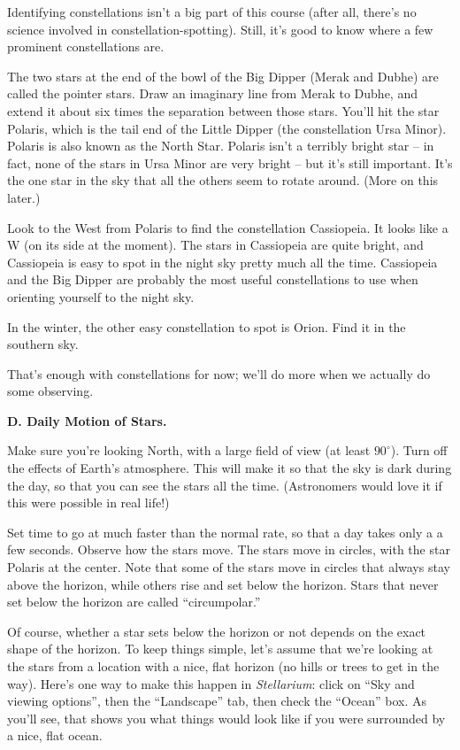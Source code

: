 Identifying constellations isn't a big part of this course (after
all, there's no science involved in constellation-spotting).  Still, it's
good to know where a few prominent constellations are.

The two stars at the end of the bowl of the Big Dipper (Merak and Dubhe)
are called the pointer stars.  Draw an imaginary line from Merak to Dubhe,
and extend it about six times the separation between those stars.
You'll hit the star Polaris, which is the tail end of the
Little Dipper (the constellation Ursa Minor).  Polaris is also known
as the North Star.  Polaris isn't a terribly bright star -- in fact,
none of the stars in Ursa Minor are very bright -- but it's still
important.  It's the one star in the sky that all the others seem
to rotate around.  (More on this later.)

Look to the West from Polaris to find the constellation Cassiopeia.  It
looks like a W (on its side at the moment).  The stars in Cassiopeia
are quite bright, and Cassiopeia is easy to spot in the night sky pretty
much all the time.  Cassiopeia and the Big Dipper are probably the most
useful constellations to use when orienting yourself to the night sky.

In the winter, the other easy constellation to spot is Orion. Find
it in the southern sky.

That's enough with constellations for now; we'll do more when we actually
do some observing.

\bigskip

{\bf D. Daily Motion of Stars.}

Make sure you're looking North, with a large field
of view (at least $90^\circ$).  Turn off the effects of Earth's 
atmosphere.
This will make it so that the sky is dark during the day, so that
you can see the stars all the time.  (Astronomers would love
it if this were possible in real life!)

Set time to go at much faster than the normal rate,
so that a day takes only a a few seconds.
Observe how the stars move.
The stars move in circles, with the star Polaris at the center.
Note that some of the stars move in circles that always stay
above the horizon, while others rise and set below the horizon.
Stars that never set below the horizon are called ``circumpolar.''

Of course, whether a star sets below the horizon or not depends on
the exact shape of the horizon. To keep things simple, let's assume that
we're looking at the stars from a location with a nice, flat horizon
(no hills or trees to get in the way). Here's one way to make this happen
in \textit{Stellarium}: click on ``Sky and viewing options'', then
the ``Landscape'' tab, then check the ``Ocean'' box. As you'll
see, that shows you what things would look like if you were surrounded
by a nice, flat ocean.

